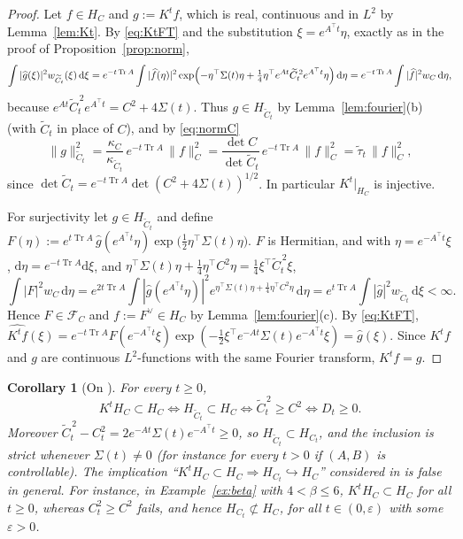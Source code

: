 \documentclass[11pt]{article}
\newtheorem{corollary}[lemma]{Corollary}
\theoremstyle{definition}
\theoremstyle{remark}
\newcommand{\Tr}{\operatorname{Tr}}
\newcommand{\dd}{\,\mathrm{d}}
\newcommand{\FC}[1]{\mathcal{F}_{#1}}
\newcommand{\Ct}{\widetilde{C}_t}
\newcommand{\taut}{\widetilde{\tau}_t}
\newcommand{\hatf}[1]{\widehat{#1}}
\newcommand{\tp}{\top}
\begin{document}
\begin{proof}
Let $f\in H_C$ and $g:=K^tf$, which is real, continuous and in $L^2$ by Lemma~\ref{lem:Kt}. By \eqref{eq:KtFT} and the
substitution $\xi=e^{A^\tp t}\eta$, exactly as in the proof of Proposition~\ref{prop:norm},
\[
\int|\hatf g(\xi)|^2w_{\Ct}(\xi)\dd\xi=e^{-t\Tr A}\int|\hatf f(\eta)|^2
\exp\Bigl(-\eta^\tp\Sigma(t)\eta+\tfrac14\eta^\tp e^{At}\Ct^{\,2}e^{A^\tp t}\eta\Bigr)\dd\eta
=e^{-t\Tr A}\int|\hatf f|^2w_C\dd\eta ,
\]
because $e^{At}\Ct^{\,2}e^{A^\tp t}=C^2+4\Sigma(t)$. Thus $g\in H_{\Ct}$ by Lemma~\ref{lem:fourier}(b) (with $\Ct$ in
place of $C$), and by \eqref{eq:normC}
\[
\|g\|_{\Ct}^2=\frac{\kappa_C}{\kappa_{\Ct}}\,e^{-t\Tr A}\,\|f\|_C^2=\frac{\det C}{\det\Ct}\,e^{-t\Tr A}\,\|f\|_C^2=\taut\,\|f\|_C^2,
\]
since $\det\Ct=e^{-t\Tr A}\det(C^2+4\Sigma(t))^{1/2}$. In particular $K^t|_{H_C}$ is injective.

For surjectivity let $g\in H_{\Ct}$ and define
$F(\eta):=e^{t\Tr A}\,\hatf g(e^{A^\tp t}\eta)\exp\bigl(\frac12\eta^\tp\Sigma(t)\eta\bigr)$. $F$ is Hermitian, and with
$\eta=e^{-A^\tp t}\xi$, $\mathrm d\eta=e^{-t\Tr A}\mathrm d\xi$, and
$\eta^\tp\Sigma(t)\eta+\frac14\eta^\tp C^2\eta=\frac14\xi^\tp\Ct^{\,2}\xi$,
\[
\int|F|^2w_C\dd\eta=e^{2t\Tr A}\int|\hatf g(e^{A^\tp t}\eta)|^2e^{\eta^\tp\Sigma(t)\eta+\frac14\eta^\tp C^2\eta}\dd\eta
=e^{t\Tr A}\int|\hatf g|^2w_{\Ct}\dd\xi<\infty .
\]
Hence $F\in\FC{C}$ and $f:=F^\vee\in H_C$ by Lemma~\ref{lem:fourier}(c). By \eqref{eq:KtFT},
$\hatf{K^tf}(\xi)=e^{-t\Tr A}F(e^{-A^\tp t}\xi)\exp(-\frac12\xi^\tp e^{-At}\Sigma(t)e^{-A^\tp t}\xi)=\hatf g(\xi)$. Since
$K^tf$ and $g$ are continuous $L^2$-functions with the same Fourier transform, $K^tf=g$.
\end{proof}

\begin{corollary}[On {\cite[Remark~4.2]{PSWPN}}]\label{cor:remark42}
For every $t\ge0$,
\[
K^tH_C\subset H_C\iff H_{\Ct}\subset H_C\iff \Ct^{\,2}\ge C^2\iff D_t\ge0 .
\]
Moreover $\Ct^{\,2}-C_t^2=2e^{-At}\Sigma(t)e^{-A^\tp t}\ge0$, so $H_{\Ct}\subset H_{C_t}$, and the inclusion is strict
whenever $\Sigma(t)\neq0$ (for instance for every $t>0$ if $(A,B)$ is controllable). The implication
``$K^tH_C\subset H_C\Rightarrow H_{C_t}\hookrightarrow H_C$'' considered in \cite[Remark~4.2]{PSWPN} is false in
general. For instance, in Example~\ref{ex:beta} with $4<\beta\le6$, $K^tH_C\subset H_C$ for all $t\ge0$, whereas
$C_t^2\ge C^2$ fails, and hence $H_{C_t}\not\subset H_C$, for all $t\in(0,\varepsilon)$ with some $\varepsilon>0$.
\end{corollary}
\end{document}
